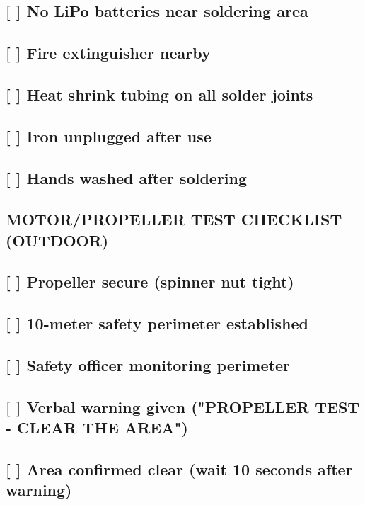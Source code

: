 \documentclass[11pt,letterpaper]{article}
\begin{document}
{{\subsection*{[ ] No LiPo batteries near soldering area}

\subsection*{[ ] Fire extinguisher nearby}

\subsection*{[ ] Heat shrink tubing on all solder joints}

\subsection*{[ ] Iron unplugged after use}

\subsection*{[ ] Hands washed after soldering}

\subsection*{MOTOR/PROPELLER TEST CHECKLIST (OUTDOOR)}

\subsection*{[ ] Propeller secure (spinner nut tight)}

\subsection*{[ ] 10-meter safety perimeter established}

\subsection*{[ ] Safety officer monitoring perimeter}

\subsection*{[ ] Verbal warning given ("PROPELLER TEST - CLEAR THE AREA")}

\subsection*{[ ] Area confirmed clear (wait 10 seconds after warning)}

}}
\end{document}
